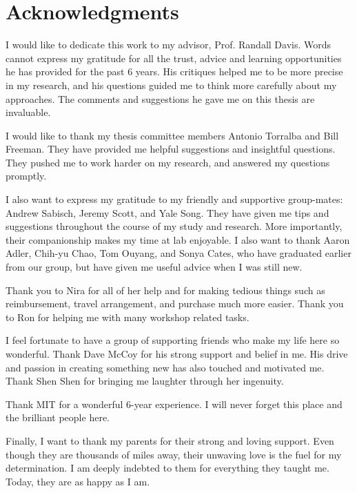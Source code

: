 % 

\cleardoublepage

\section*{Acknowledgments}

I would like to dedicate this work to my advisor, Prof. Randall Davis. Words
cannot express my gratitude for all the trust, advice and learning opportunities
he has provided for the past 6 years. His critiques helped me to be more precise
in my research, and his questions guided me to think more carefully about my
approaches. The comments and suggestions he gave me on this thesis are
invaluable.

I would like to thank my thesis committee members Antonio Torralba and Bill
Freeman. They have provided me helpful suggestions and insightful questions.
They pushed me to work harder on my research, and answered my questions
promptly.

I also want to express my gratitude to my friendly and supportive group-mates:
Andrew Sabisch, Jeremy Scott, and Yale Song. They have given me tips and
suggestions throughout the course of my study and research. More importantly,
their companionship makes my time at lab enjoyable. I also want
to thank Aaron Adler, Chih-yu Chao, Tom Ouyang, and Sonya Cates, who have
graduated earlier from our group, but have given me useful advice when I was
still new.

Thank you to Nira for all of her help and for making tedious things such as
reimbursement, travel arrangement, and purchase much more easier. Thank you
to Ron for helping me with many workshop related tasks.

I feel fortunate to have a group of supporting friends who make my life here
so wonderful. Thank Dave McCoy for his strong support and belief in me. His
drive and passion in creating something new has also touched and motivated me.
Thank Shen Shen for bringing me laughter through her ingenuity. 

Thank MIT for a wonderful 6-year experience. I will never forget this place and
the brilliant people here.

Finally, I want to thank my parents for their
strong and loving support. Even though they are thousands of miles away, their
unwaving love is the fuel for my determination. I am deeply indebted to them for
everything they taught me. Today, they are as happy as I am.


